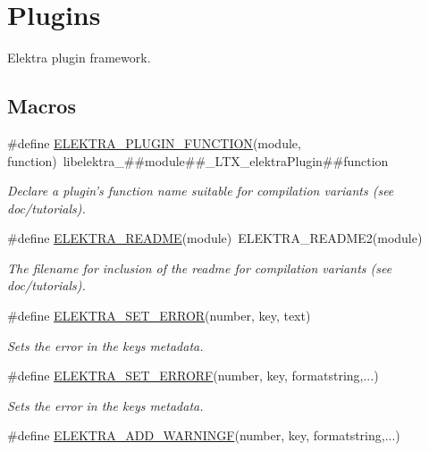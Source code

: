 \hypertarget{group__plugin}{\section{Plugins}
\label{group__plugin}
}


Elektra plugin framework.  


\subsection*{Macros}
\begin{DoxyCompactItemize}
\item 
\#define \hyperlink{group__plugin_ga34d1a66f0a6e89cfd20f4014a9975a2a}{E\+L\+E\+K\+T\+R\+A\+\_\+\+P\+L\+U\+G\+I\+N\+\_\+\+F\+U\+N\+C\+T\+I\+O\+N}(module, function)~libelektra\+\_\+\#\#module\#\#\+\_\+\+L\+T\+X\+\_\+elektra\+Plugin\#\#function
\begin{DoxyCompactList}\small\item\em Declare a plugin's function name suitable for compilation variants (see doc/tutorials). \end{DoxyCompactList}\item 
\#define \hyperlink{group__plugin_ga78d616f68bf9fb0942f66478597467c6}{E\+L\+E\+K\+T\+R\+A\+\_\+\+R\+E\+A\+D\+M\+E}(module)~E\+L\+E\+K\+T\+R\+A\+\_\+\+R\+E\+A\+D\+M\+E2(module)
\begin{DoxyCompactList}\small\item\em The filename for inclusion of the readme for compilation variants (see doc/tutorials). \end{DoxyCompactList}\item 
\#define \hyperlink{group__plugin_gaab1842b82272e6d4235b6a71587a64d9}{E\+L\+E\+K\+T\+R\+A\+\_\+\+S\+E\+T\+\_\+\+E\+R\+R\+O\+R}(number, key, text)
\begin{DoxyCompactList}\small\item\em Sets the error in the keys metadata. \end{DoxyCompactList}\item 
\#define \hyperlink{group__plugin_ga3e4fc2c20d8e64bed7a54bb1af882e34}{E\+L\+E\+K\+T\+R\+A\+\_\+\+S\+E\+T\+\_\+\+E\+R\+R\+O\+R\+F}(number, key, formatstring,...)
\begin{DoxyCompactList}\small\item\em Sets the error in the keys metadata. \end{DoxyCompactList}\item 
\#define \hyperlink{group__plugin_ga2bbb3bc3a3bdaf5b34b52de81886a098}{E\+L\+E\+K\+T\+R\+A\+\_\+\+A\+D\+D\+\_\+\+W\+A\+R\+N\+I\+N\+G\+F}(number, key, formatstring,...)

\end{DoxyCompactItemize}
